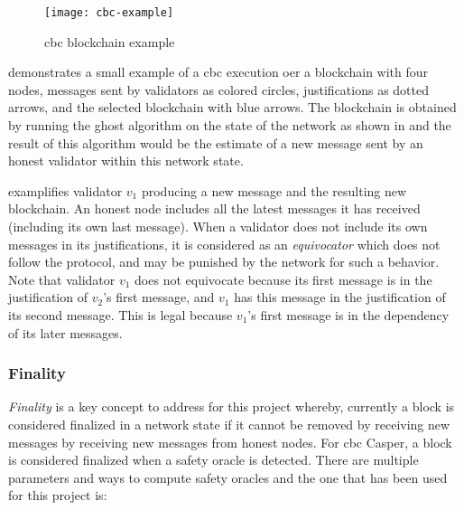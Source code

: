 \begin{figure}[h]
	\centering
	\texttt{[image: cbc-example]}
    \caption{\gls{cbc} blockchain example }
	\label{fig:example}
\end{figure}

 demonstrates a small example of a \gls{cbc} execution oer a
blockchain with four nodes, messages sent by validators as colored circles,
justifications as dotted arrows, and the selected blockchain with blue arrows.
The blockchain is obtained by running the \gls{ghost} algorithm on the state of
the network as shown in  and the result of this algorithm would
be the estimate of a new message sent by an honest validator within this network
state. 

 examplifies validator \(v_1\) producing a new message and the
resulting new blockchain. An honest node includes all the latest messages it has
received (including its own last message).  When a validator does not include
its own messages in its justifications, it is considered as an
\textit{equivocator} which does not follow the protocol, and may be punished by
the network for such a behavior. Note that validator \(v_1\) does not equivocate
because its first message is in the justification of \(v_2\)'s first message,
and \(v_1\) has this message in the justification of its second message. This is
legal because \(v_1\)'s first message is in the dependency of its later
messages.

\subsubsection{Finality}
\label{ssec:finality}

\textit{Finality} is a key concept to address for this project whereby,
currently a block is considered finalized in a network state if it cannot be
removed by receiving new messages by receiving new messages from honest nodes. 
For \gls{cbc} Casper, a block is considered finalized when a safety oracle is
detected. There are multiple parameters and ways to compute safety oracles and
the one that has been used for this project is: 

